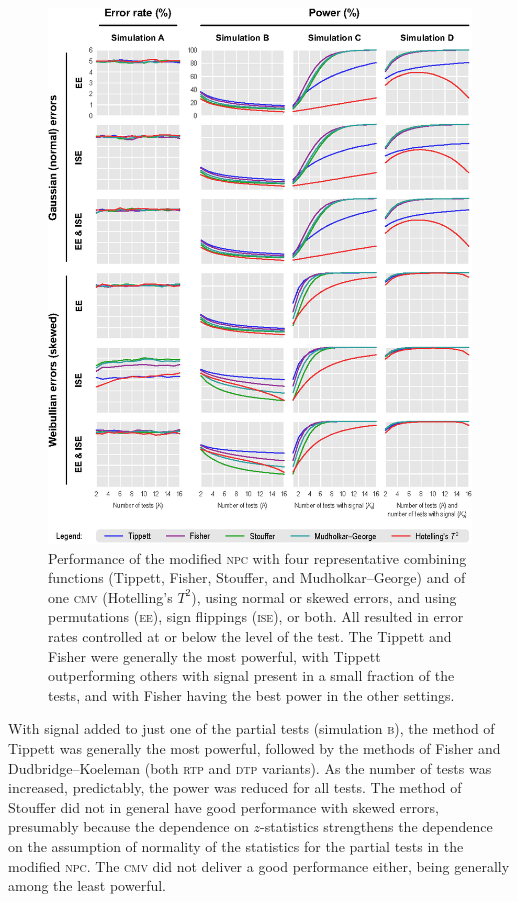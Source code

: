 \begin{figure}[p]
\begin{center}
\centerline{\includegraphics{images/performance.eps}}
\end{center}
\vspace{-3mm}
\caption{Performance of the modified \textsc{npc} with four representative combining functions (Tippett, Fisher, Stouffer, and Mudholkar--George) and of one \textsc{cmv} (Hotelling's $T^2$), using normal or skewed errors, and using permutations (\textsc{ee}), sign flippings (\textsc{ise}), or both. All resulted in error rates controlled at or below the level of the test. The Tippett and Fisher were generally the most powerful, with Tippett outperforming others with signal present in a small fraction of the tests, and with Fisher having the best power in the other settings.}
\label{fig:performance}
\end{figure}

With signal added to just one of the partial tests (simulation \textsc{b}), the method of Tippett was generally the most powerful, followed by the methods of Fisher and Dudbridge--Koeleman (both \textsc{rtp} and \textsc{dtp} variants). As the number of tests was increased, predictably, the power was reduced for all tests. The method of Stouffer did not in general have good performance with skewed errors, presumably because the dependence on $z$-statistics strengthens the dependence on the assumption of normality of the statistics for the partial tests in the modified \textsc{npc}. The \textsc{cmv} did not deliver a good performance either, being generally among the least powerful.

